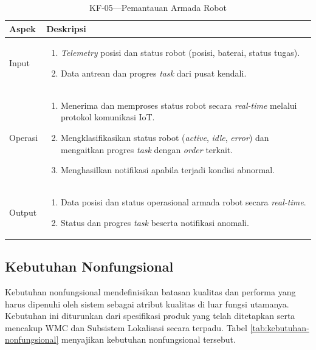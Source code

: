 \begin{xltabular}{\textwidth}{ | l | X | }
  \caption{KF-05---Pemantauan Armada Robot} \label{tab:kf05} \\
  \hline
  \textbf{Aspek} & \textbf{Deskripsi} \\
  \hline
  \endfirsthead
  \hline
  \endfoot
  Input &
  \begin{enumerate}[leftmargin=*,nosep]
    \item \textit{Telemetry} posisi dan status robot (posisi, baterai, status tugas).
    \item Data antrean dan progres \textit{task} dari pusat kendali.
  \end{enumerate} \\
  \hline
  Operasi &
  \begin{enumerate}[leftmargin=*,nosep]
    \item Menerima dan memproses status robot secara \textit{real-time} melalui protokol komunikasi IoT.
    \item Mengklasifikasikan status robot (\textit{active}, \textit{idle}, \textit{error}) dan mengaitkan progres \textit{task} dengan \textit{order} terkait.
    \item Menghasilkan notifikasi apabila terjadi kondisi abnormal.
  \end{enumerate} \\
  \hline
  Output &
  \begin{enumerate}[leftmargin=*,nosep]
    \item Data posisi dan status operasional armada robot secara \textit{real-time}.
    \item Status dan progres \textit{task} beserta notifikasi anomali.
  \end{enumerate} \\
  \hline
\end{xltabular}

\subsection{Kebutuhan Nonfungsional}
\label{sec:kebutuhan-nonfungsional}
Kebutuhan nonfungsional mendefinisikan batasan kualitas dan performa yang harus dipenuhi oleh sistem sebagai atribut kualitas di luar fungsi utamanya. Kebutuhan ini diturunkan dari spesifikasi produk yang telah ditetapkan serta mencakup WMC dan Subsistem Lokalisasi secara terpadu. Tabel \ref{tab:kebutuhan-nonfungsional} menyajikan kebutuhan nonfungsional tersebut.


